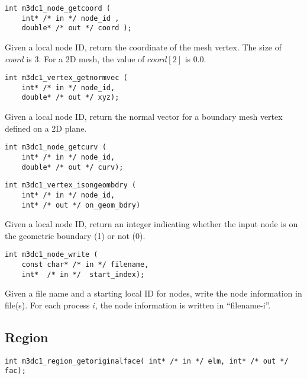 \begin{verbatim}
int m3dc1_node_getcoord (
    int* /* in */ node_id , 
    double* /* out */ coord ); 
\end{verbatim}\vspace{-.5cm}\hspace{1cm}
Given a local node ID, return the coordinate of the mesh vertex. The size of \textit{coord} is 3. For a 2D mesh, the value of $coord[2]$ is 0.0. 

\begin{verbatim}
int m3dc1_vertex_getnormvec (
    int* /* in */ node_id, 
    double* /* out */ xyz);
\end{verbatim}\vspace{-.5cm}\hspace{1cm}
Given a local node ID, return the normal vector for a boundary mesh vertex defined on a 2D plane.

\begin{verbatim}
int m3dc1_node_getcurv (
    int* /* in */ node_id, 
    double* /* out */ curv); 
\end{verbatim}\vspace{-.5cm}\hspace{1cm}

\begin{verbatim}
int m3dc1_vertex_isongeombdry (
    int* /* in */ node_id, 
    int* /* out */ on_geom_bdry)
\end{verbatim}\vspace{-.5cm}\hspace{1cm}
Given a local node ID, return an integer indicating whether the input node is on the geometric boundary (1) or not (0).

\begin{verbatim}
int m3dc1_node_write (
    const char* /* in */ filename, 
    int*  /* in */  start_index);
\end{verbatim}\vspace{-.5cm}\hspace{1cm}
Given a file name and a starting local ID for nodes, write the node information in file(s). For each process $i$, the node information is written in ``filename-i''.

\subsection{Region}
\begin{verbatim}
int m3dc1_region_getoriginalface( int* /* in */ elm, int* /* out */ fac);
\end{verbatim}\vspace{-.5cm}\hspace{1cm}

